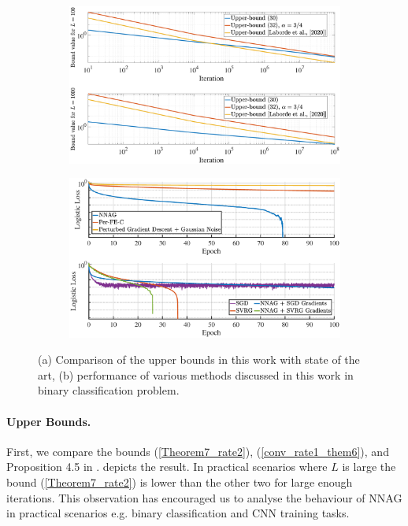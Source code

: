 \documentclass{article}
\theoremstyle{plain}
\theoremstyle{definition}
\theoremstyle{remark}
\begin{document}
\begin{figure}
  \begin{subfigure}{0.51\textwidth}
    \includegraphics[width=\linewidth]{NIPS 2023/Data/upperbounds.eps}
    \caption{} \label{fig1}
  \end{subfigure}%
  \hspace*{\fill}   %
  \begin{subfigure}{0.51\textwidth}
    \includegraphics[width=\linewidth]{NIPS 2023/Data/binary_me_sgd_svrg_corrected_me_sgd_2e5_gaussian_noise_and_no_noise_100_epochs.eps}
    \caption{} \label{fig2}
  \end{subfigure}%
\caption{(a) Comparison of the upper bounds in this work with state of the art, (b) performance of various methods discussed in this work in binary classification problem.} \label{fig:1}
\end{figure}
\paragraph{Upper Bounds.}
First, we compare the bounds (\ref{Theorem7_rate2}), (\ref{conv_rate1_them6}), and Proposition 4.5 in \citep{pmlr-v108-laborde20a}.  depicts the result. In practical scenarios where \(L\) is large \citep{shi2022efficiently} the bound (\ref{Theorem7_rate2}) is lower than the other two for large enough iterations. This observation has encouraged us to analyse the behaviour of NNAG in practical scenarios e.g. binary classification and CNN training tasks.
\end{document}

